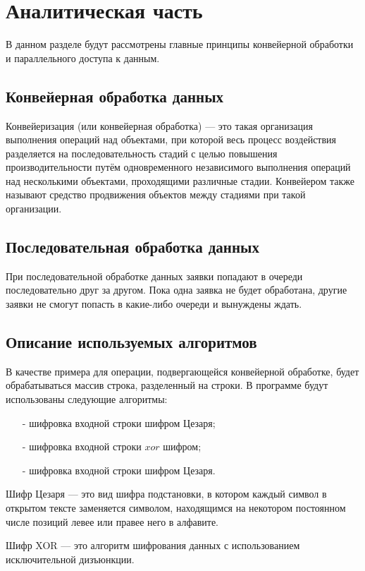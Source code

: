 \chapter{Аналитическая часть}

В данном разделе будут рассмотрены главные принципы конвейерной обработки и параллельного доступа к данным.

\section{Конвейерная обработка данных}
Конвейеризация (или конвейерная обработка) --- это такая организация выполнения операций над объектами, при которой весь процесс воздействия разделяется на последовательность стадий с целью повышения производительности путём одновременного независимого выполнения операций над несколькими объектами, проходящими различные стадии. Конвейером также называют средство продвижения объектов между стадиями при такой организации.

\section{Последовательная обработка данных}
При последовательной обработке данных заявки попадают в очереди последовательно друг за другом. Пока одна заявка не будет обработана, другие заявки не смогут попасть в какие-либо очереди и вынуждены ждать.

\section{Описание используемых алгоритмов}
В качестве примера для операции, подвергающейся конвейерной обработке, будет обрабатываться массив строка, разделенный на строки. 
\newpage
В программе будут использованы следующие алгоритмы:
\begin{itemize}[itemindent=1em]
	\item[-] шифровка входной строки шифром Цезаря;
\item[-] шифровка входной строки $xor$ шифром;
\item[-] шифровка входной строки шифром Цезаря.
\end{itemize} 

Шифр Цезаря --- это вид шифра подстановки, в котором каждый символ в открытом тексте заменяется символом, находящимся на некотором постоянном числе позиций левее или правее него в алфавите.

Шифр XOR --- это алгоритм шифрования данных с использованием исключительной дизъюнкции.


